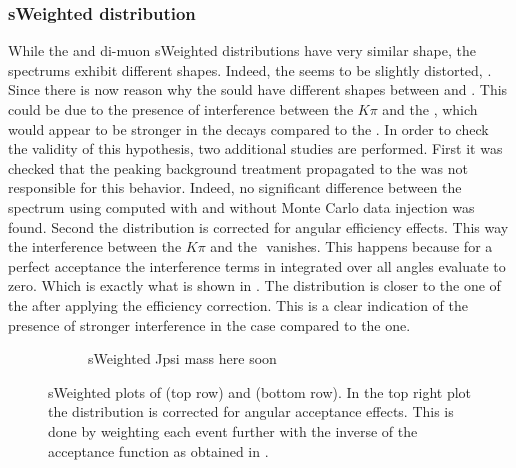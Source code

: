 \subsubsection{sWeighted \mkpi distribution}
While the \Bs and \Bd di-muon sWeighted distributions have very similar shape, the \mkpi spectrums exhibit different shapes. 
Indeed, the \Bs \mkpi \sPlot seems to be slightly distorted, . Since there is now reason why the \Kst \pwave 
sould have different shapes between \BsJpsiKst and \BdJpsiKst. This could be due to the presence of interference between
the $K\pi$ \swave and the \Kstarz, which would appear to be stronger in the \Bs decays compared to the \Bd. In order 
to check the validity of this hypothesis, two additional studies are performed. First it was checked that the peaking
background treatment propagated to the \sWeights was not responsible for this behavior. Indeed, no significant difference 
between the \Bs \mkpi spectrum using \sWeights computed with and without Monte Carlo data injection was found. Second the \mkpi 
distribution is corrected for angular efficiency effects. This way the interference between the $K\pi$ \swave and the 
\Kstarz $ $ \pwave vanishes. This happens because for a perfect acceptance the interference terms in  integrated over all angles
evaluate to zero. Which is exactly what is shown in . The \Bs \mkpi distribution is closer to the one of the \Bd after applying
the efficiency correction. This is a clear indication of the presence of stronger interference in the \Bs case compared to the \Bd one.

\begin{figure}[h]
  \centering
  \begin{subfigure}{0.5\textwidth}
    \scalebox{0.65}{}
    \caption{}
    \label{mkpiPlot_raw}
  \end{subfigure}%
  \hfill%
  \begin{subfigure}{0.5\textwidth}
    \scalebox{0.65}{}
    \caption{}
    \label{mkpiPlot_eff}
  \end{subfigure}
  \begin{subfigure}{0.5\textwidth}
    \caption{\color{red} sWeighted Jpsi mass here soon}
    \label{jpsiPlot}
  \end{subfigure}
\caption{sWeighted plots of \mkpi(top row) and \jpsi (bottom row). In the top right plot the \mkpi distribution
         is corrected for angular acceptance effects. This is done by weighting each event further with the inverse 
         of the acceptance function as obtained in .}
\end{figure}

